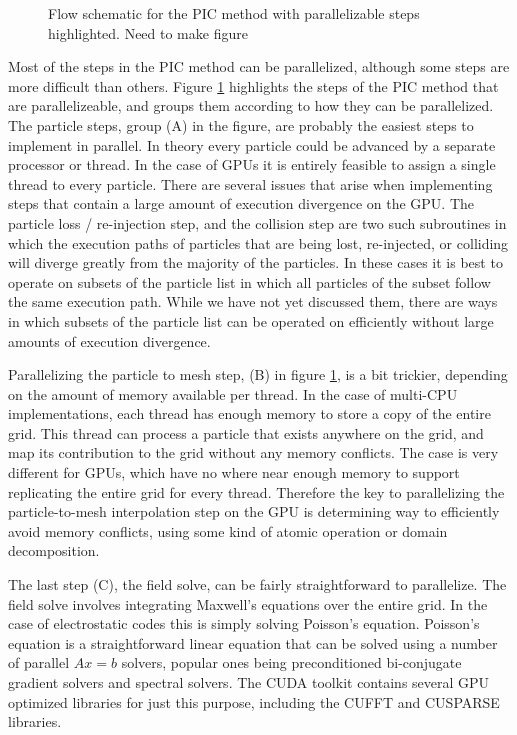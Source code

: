 \begin{figure}
\begin{center}

\end{center}
\caption{Flow schematic for the PIC method with parallelizable steps highlighted. Need to make figure}
\label{fig:pic_flowchart_parallel}
\end{figure}

Most of the steps in the PIC method can be parallelized, although some steps are more difficult than others. Figure \ref{fig:pic_flowchart_parallel} highlights the steps of the PIC method that are parallelizeable, and groups them according to how they can be parallelized. The particle steps, group (A) in the figure, are probably the easiest steps to implement in parallel. In theory every particle could be advanced by a separate processor or thread. In the case of GPUs it is entirely feasible to assign a single thread to every particle. There are several issues that arise when implementing steps that contain a large amount of execution divergence on the GPU. The particle loss / re-injection step, and the collision step are two such subroutines in which the execution paths of particles that are being lost, re-injected, or colliding will diverge greatly from the majority of the particles. In these cases it is best to operate on subsets of the particle list in which all particles of the subset follow the same execution path. While we have not yet discussed them, there are ways in which subsets of the particle list can be operated on efficiently without large amounts of execution divergence. 

Parallelizing the particle to mesh step, (B) in figure \ref{fig:pic_flowchart_parallel}, is a bit trickier, depending on the amount of memory available per thread. In the case of multi-CPU implementations, each thread has enough memory to store a copy of the entire grid. This thread can process a particle that exists anywhere on the grid, and map its contribution to the grid without any memory conflicts. The case is very different for GPUs, which have no where near enough memory to support replicating the entire grid for every thread. Therefore the key to parallelizing the particle-to-mesh interpolation step on the GPU is determining way to efficiently avoid memory conflicts, using some kind of atomic operation or domain decomposition. 

The last step (C), the field solve, can be fairly straightforward to parallelize. The field solve involves integrating Maxwell's equations over the entire grid. In the case of electrostatic codes this is simply solving Poisson's equation. Poisson's equation is a straightforward linear equation that can be solved using a number of parallel $Ax=b$ solvers, popular ones being preconditioned bi-conjugate gradient solvers and spectral solvers. The CUDA toolkit contains several GPU optimized libraries for just this purpose, including the CUFFT and CUSPARSE libraries. 


